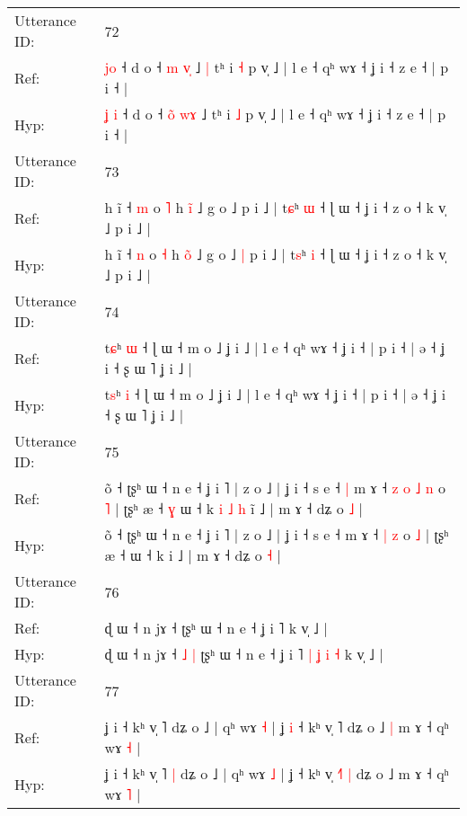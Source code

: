 \documentclass[10pt]{article}
\DeclareRobustCommand{\hl}[1]{{\textcolor{red}{#1}}}
\begin{document}
\begin{longtable}{ll}
 \\
\midrule
Utterance ID: & 72 \\
Ref: & \hl{}\hl{j}\hl{o} ˧ d o ˧ \hl{}\hl{m} \hl{v}\hl{̩} ˩\hl{ }\hl{|} tʰ i \hl{˧} p v̩ ˩ | l e ˧ qʰ wɤ ˧ ʝ i ˧ z e ˧ | p i ˧ |
 \\
Hyp: & \hl{ʝ}\hl{ }\hl{i} ˧ d o ˧ \hl{o}\hl{̃} \hl{w}\hl{ɤ} ˩\hl{}\hl{} tʰ i \hl{˩} p v̩ ˩ | l e ˧ qʰ wɤ ˧ ʝ i ˧ z e ˧ | p i ˧ |
 \\
\midrule
Utterance ID: & 73 \\
Ref: & h ĩ ˧ \hl{m} o \hl{˥} h \hl{i}̃ ˩ g o ˩\hl{}\hl{} p i ˩ | t\hl{ɕ}ʰ \hl{ɯ} ˧ ɭ ɯ ˧ ʝ i ˧ z o ˧ k v̩ ˩ p i ˩ |
 \\
Hyp: & h ĩ ˧ \hl{n} o \hl{˧} h \hl{o}̃ ˩ g o ˩\hl{ }\hl{|} p i ˩ | t\hl{s}ʰ \hl{i} ˧ ɭ ɯ ˧ ʝ i ˧ z o ˧ k v̩ ˩ p i ˩ |
 \\
\midrule
Utterance ID: & 74 \\
Ref: & t\hl{ɕ}ʰ \hl{ɯ} ˧ ɭ ɯ ˧ m o ˩ ʝ i ˩ | l e ˧ qʰ wɤ ˧ ʝ i ˧ | p i ˧ | ə ˧ ʝ i ˧ ʂ ɯ ˥ ʝ i ˩ |
 \\
Hyp: & t\hl{s}ʰ \hl{i} ˧ ɭ ɯ ˧ m o ˩ ʝ i ˩ | l e ˧ qʰ wɤ ˧ ʝ i ˧ | p i ˧ | ə ˧ ʝ i ˧ ʂ ɯ ˥ ʝ i ˩ |
 \\
\midrule
Utterance ID: & 75 \\
Ref: & õ ˧ ʈʂʰ ɯ ˧ n e ˧ ʝ i ˥ | z o ˩ | ʝ i ˧ s e ˧\hl{ }\hl{|} m ɤ ˧\hl{ }\hl{z}\hl{ }\hl{o} \hl{˩} \hl{n} o \hl{˥} | ʈʂʰ æ ˧\hl{ }\hl{ɣ} ɯ ˧ k\hl{ }\hl{i}\hl{ }\hl{˩}\hl{ }\hl{h} i\hl{̃} ˩ | m ɤ ˧ dʑ o \hl{˩} |
 \\
Hyp: & õ ˧ ʈʂʰ ɯ ˧ n e ˧ ʝ i ˥ | z o ˩ | ʝ i ˧ s e ˧\hl{}\hl{} m ɤ ˧\hl{}\hl{}\hl{}\hl{} \hl{|} \hl{z} o \hl{˩} | ʈʂʰ æ ˧\hl{}\hl{} ɯ ˧ k\hl{}\hl{}\hl{}\hl{}\hl{}\hl{} i\hl{} ˩ | m ɤ ˧ dʑ o \hl{˧} |
 \\
\midrule
Utterance ID: & 76 \\
Ref: & ɖ ɯ ˧ n jɤ ˧\hl{}\hl{}\hl{}\hl{} ʈʂʰ ɯ ˧ n e ˧ ʝ i ˥\hl{}\hl{}\hl{}\hl{}\hl{}\hl{}\hl{}\hl{} k v̩ ˩ |
 \\
Hyp: & ɖ ɯ ˧ n jɤ ˧\hl{ }\hl{˩}\hl{ }\hl{|} ʈʂʰ ɯ ˧ n e ˧ ʝ i ˥\hl{ }\hl{|}\hl{ }\hl{ʝ}\hl{ }\hl{i}\hl{ }\hl{˧} k v̩ ˩ |
 \\
\midrule
Utterance ID: & 77 \\
Ref: & ʝ i ˧ kʰ v̩ ˥\hl{}\hl{} dʑ o ˩ | qʰ wɤ \hl{˧} | ʝ\hl{ }\hl{i} ˧ kʰ v̩ \hl{}˥\hl{}\hl{} dʑ o ˩\hl{ }\hl{|} m ɤ ˧ qʰ wɤ \hl{˧} |
 \\
Hyp: & ʝ i ˧ kʰ v̩ ˥\hl{ }\hl{|} dʑ o ˩ | qʰ wɤ \hl{˩} | ʝ\hl{}\hl{} ˧ kʰ v̩ \hl{˧}˥\hl{ }\hl{|} dʑ o ˩\hl{}\hl{} m ɤ ˧ qʰ wɤ \hl{˥} |
 \\

\end{longtable}
\end{document}
